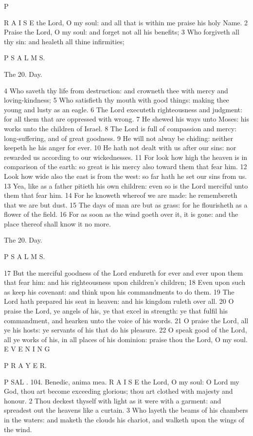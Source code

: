 P

R A I S E the Lord, O my soul: and all that is within me praise his holy Name. 2 Praise the Lord, O my soul: and forget not all his benefits; 3 Who forgiveth all thy sin: and healeth all thine infirmities;

P S A L M S.

The 20. Day.

4 Who saveth thy life from destruction: and crowneth thee with mercy and loving-kindness; 5 Who satisfieth thy mouth with good things: making thee young and lusty as an eagle. 6 The Lord executeth righteousness and judgment: for all them that are oppressed with wrong. 7 He shewed his ways unto Moses: his works unto the children of Israel. 8 The Lord is full of compassion and mercy: long-suffering, and of great goodness. 9 He will not alway be chiding: neither keepeth he his anger for ever. 10 He hath not dealt with us after our sins: nor rewarded us according to our wickednesses. 11 For look how high the heaven is in comparison of the earth: so great is his mercy also toward them that fear him. 12 Look how wide also the east is from the west: so far hath he set our sins from us. 13 Yea, like as a father pitieth his own children: even so is the Lord merciful unto them that fear him. 14 For he knoweth whereof we are made: he remembereth that we are but dust. 15 The days of man are but as grass: for he flourisheth as a flower of the field. 16 For as soon as the wind goeth over it, it is gone: and the place thereof shall know it no more.

The 20. Day.

P S A L M S.

17 But the merciful goodness of the Lord endureth for ever and ever upon them that fear him: and his righteousness upon children’s children; 18 Even upon such as keep his covenant: and think upon his commandments to do them. 19 The Lord hath prepared his seat in heaven: and his kingdom ruleth over all. 20 O praise the Lord, ye angels of his, ye that excel in strength: ye that fulfil his commandment, and hearken unto the voice of his words. 21 O praise the Lord, all ye his hosts: ye servants of his that do his pleasure. 22 O speak good of the Lord, all ye works of his, in all places of his dominion: praise thou the Lord, O my soul. E V E N I N G

P R A Y E R.

P SAL . 104. Benedic, anima mea. R A I S E the Lord, O my soul: O Lord my God, thou art become exceeding glorious; thou art clothed with majesty and honour. 2 Thou deckest thyself with light as it were with a garment: and spreadest out the heavens like a curtain. 3 Who layeth the beams of his chambers in the waters: and maketh the clouds his chariot, and walketh upon the wings of the wind.

